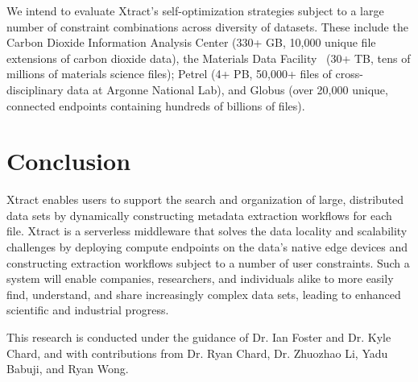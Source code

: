 \documentclass[sigconf, 9pt]{acmart}
\newcommand{\name}{Xtract}
\begin{document}
We intend to evaluate \name{}'s self-optimization strategies subject to a large number of constraint combinations across diversity of datasets. 
These include the Carbon Dioxide Information Analysis Center (330+ GB, 10,000 
unique file extensions of carbon dioxide data), the Materials Data Facility~\cite{ blaiszik2019mdf} (30+ TB, tens of millions of materials science files); 
Petrel (4+ PB, 50,000+ files of cross-disciplinary data at Argonne National Lab), and Globus (over 20,000 unique, connected 
endpoints containing hundreds of billions of files).


\section{Conclusion}
\label{sec:conc}

\name{} enables users to support the search and organization of large, distributed data sets by dynamically constructing metadata extraction 
workflows for each file. \name{} is a serverless middleware that solves the data locality and scalability challenges by deploying compute endpoints on the data's native edge
devices and constructing extraction workflows subject to a number of user constraints. Such a system will enable companies, researchers, and individuals alike to more easily find, understand, and share increasingly 
complex data sets, leading to enhanced scientific and industrial progress. 


\begin{acks}

This research is conducted under the guidance of Dr. Ian Foster and Dr. Kyle Chard, and with contributions
from Dr. Ryan Chard, Dr. Zhuozhao Li, Yadu Babuji, and Ryan Wong. 


\end{acks}


\end{document}
